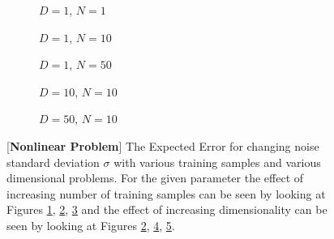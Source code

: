 \begin{figure}[!h]
  \centering
    \begin{subfigure}{0.3\textwidth}
      \centering
      \caption{$D=1$, $N=1$}
      \label{fig:nonlinear-std_y-N-1-D-1}
    \end{subfigure}
    \begin{subfigure}{0.3\textwidth}
      \centering
      \caption{$D=1$, $N=10$}
      \label{fig:nonlinear-std_y-N-10-D-1}
    \end{subfigure}
    \begin{subfigure}{0.3\textwidth}
      \centering
      \caption{$D=1$, $N=50$}
      \label{fig:nonlinear-std_y-N-50-D-1}
    \end{subfigure}

    \begin{subfigure}{0.3\textwidth}
      \centering
      \caption{$D=10$, $N=10$}
      \label{fig:nonlinear-std_y-N-10-D-10}
    \end{subfigure}
    \begin{subfigure}{0.3\textwidth}
      \centering
      \caption{$D=50$, $N=10$}
      \label{fig:nonlinear-std_y-N-10-D-50}
    \end{subfigure}  

  \caption{[\textbf{Nonlinear Problem}] The Expected Error for changing noise standard deviation $\sigma$ with various training samples and various dimensional problems. For the given parameter the effect of increasing number of training samples can be seen by looking at Figures \ref{fig:nonlinear-std_y-N-1-D-1}, \ref{fig:nonlinear-std_y-N-10-D-1}, \ref{fig:nonlinear-std_y-N-50-D-1} and the effect of increasing dimensionality can be seen by looking at Figures \ref{fig:nonlinear-std_y-N-10-D-1}, \ref{fig:nonlinear-std_y-N-10-D-10}, \ref{fig:nonlinear-std_y-N-10-D-50}.}\label{fig:nonlinear-std_y}
\end{figure}


